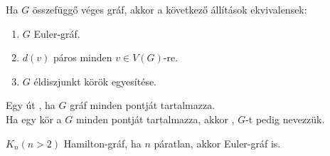 \begin{frame}
\begin{tcolorbox}[title={Tétel: Euler gráfok}]
Ha $G$ összefüggő véges gráf, akkor a következő állítások ekvivalensek:\\
\begin{enumerate}
\item $G$ Euler-gráf.
\item $d(v)$ páros minden $v \in V(G)$-re.
\item $G$ éldiszjunkt körök egyesítése.
\end{enumerate}
\end{tcolorbox}
\end{frame}

\begin{frame}
\begin{tcolorbox}[title={Def.: Hamilton gráfok}]
Egy út , ha $G$ gráf minden pontját tartalmazza.\\
\mmedskip
Ha egy kör a $G$ minden pontját tartalmazza, akkor , $G$-t pedig  nevezzük.
\end{tcolorbox}

\begin{tcolorbox}[title={Ész}]
$K_n(n > 2)$ Hamilton-gráf, ha $n$ páratlan, akkor Euler-gráf is.
\end{tcolorbox}



\begin{tcolorbox}[title={Példák}]
\begin{tcbposter}[
poster = {height=7cm,spacing=2mm,rows=3},
boxes = {colframe=mybg, colback=mybg},
]





\end{tcbposter}
\end{tcolorbox}
\end{frame}
